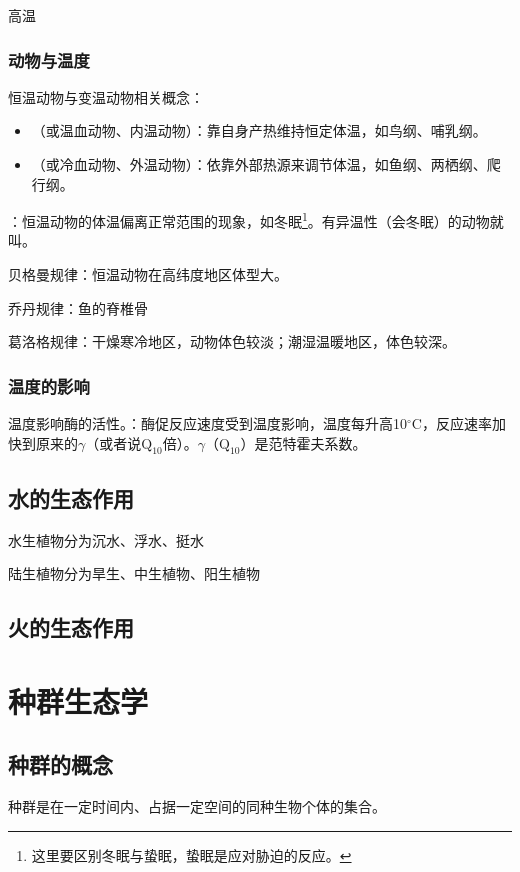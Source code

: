 高温
\subsubsection{动物与温度}

恒温动物与变温动物相关概念：
\begin{itemize}
	\item {}（或温血动物、内温动物）：靠自身产热维持恒定体温，如鸟纲、哺乳纲。
	\item {}（或冷血动物、外温动物）：依靠外部热源来调节体温，如鱼纲、两栖纲、爬行纲。
\end{itemize}

：恒温动物的体温偏离正常范围的现象，如冬眠\footnote{这里要区别冬眠与蛰眠，蛰眠是应对胁迫的反应。}。有异温性（会冬眠）的动物就叫。

贝格曼规律：恒温动物在高纬度地区体型大。

乔丹规律：鱼的脊椎骨

葛洛格规律：干燥寒冷地区，动物体色较淡；潮湿温暖地区，体色较深。
\subsubsection{温度的影响}
温度影响酶的活性。：酶促反应速度受到温度影响，温度每升高10$^{\circ}\textrm{C}$，反应速率加快到原来的$\gamma$（或者说$\textrm{Q}_{10}$倍）。$\gamma$（$\textrm{Q}_{10}$）是范特霍夫系数。

\subsection{水的生态作用}

水生植物分为沉水、浮水、挺水

陆生植物分为旱生、中生植物、阳生植物

\subsection{火的生态作用}

\section{种群生态学}
\subsection{种群的概念}

种群是在一定时间内、占据一定空间的同种生物个体的集合。

